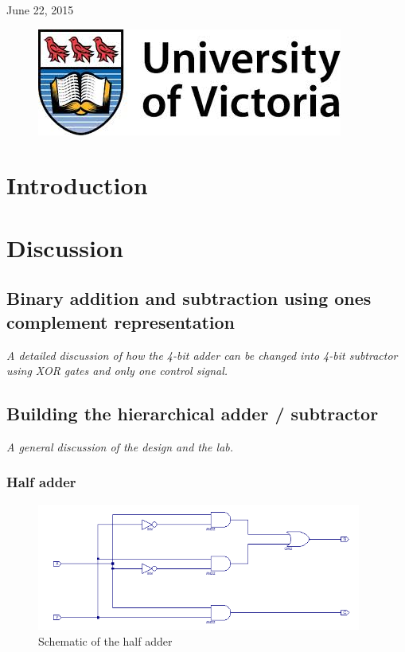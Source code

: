 \documentclass[11pt]{article}
\begin{document}
\begin{titlepage}
{\large June 22, 2015}\\ %

\begin{figure}[b]	 %
	\centering
	\includegraphics[scale=0.3]{UVic_logo}
\end{figure}

\end{titlepage}


\section{Introduction}

\section{Discussion}

\subsection{Binary addition and subtraction using ones complement representation}
{\em A detailed discussion of how the 4-bit adder can be changed into 4-bit subtractor using XOR gates and only one control signal.}

\subsection{Building the hierarchical adder / subtractor}
{\em A general discussion of the design and the lab.}

\subsubsection{Half adder}
\begin{figure}[htpb]
	\centering
	\includegraphics[width=0.95\textwidth]{HA-schematic}
	\caption{Schematic of the half adder}
	\label{fig:HA_schematic}
\end{figure}
\end{document}
